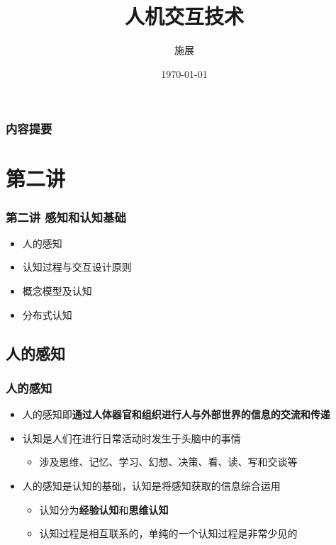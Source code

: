 \documentclass{beamer}
\title{人机交互技术}
\author{施展}
\institute{华中科技大学~武汉光电国家实验室}
\date{\today}
\begin{document}
\begin{frame}
	\titlepage
\end{frame}

\begin{frame}
	\frametitle{内容提要}
	\tableofcontents
\end{frame}

\section{第二讲}
\begin{frame}
	\frametitle{第二讲 感知和认知基础}
	\begin{itemize}
		\item 人的感知
		\item 认知过程与交互设计原则
		\item 概念模型及认知
		\item 分布式认知
	\end{itemize}
\end{frame}

\subsection{人的感知}
\begin{frame}
	\frametitle{人的感知}
	\beamertemplatetransparentcovereddynamicmedium 
	\begin{itemize}[<+->]
		\item 人的感知即\textbf{通过人体器官和组织进行人与外部世界的信息的交流和传递}
		\item 认知是人们在进行日常活动时发生于头脑中的事情
		\begin{itemize}
			\item 涉及思维、记忆、学习、幻想、决策、看、读、写和交谈等
		\end{itemize}
		\item 人的感知是认知的基础，认知是将感知获取的信息综合运用
		\begin{itemize}
			\item 认知分为\textbf{经验认知}和\textbf{思维认知}
			\item 认知过程是相互联系的，单纯的一个认知过程是非常少见的
		\end{itemize}
	\end{itemize}
\end{frame}
\end{document}
